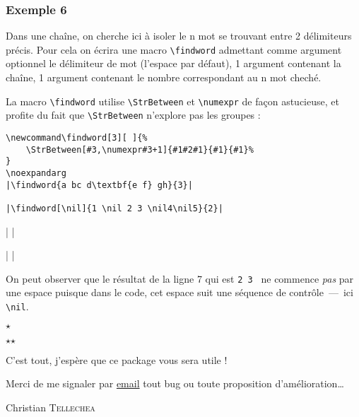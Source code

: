 \documentclass[a4paper,10pt,french]{article}
\newcommand\styleexercice{\footnotesize}
\newcommand\verbinline{\lstinline[basicstyle=\normalsize\ttfamily]}
\begin{document}
\subsubsection{Exemple 6}
Dans une chaîne, on cherche ici à isoler le n\ieme{} mot se trouvant entre 2 délimiteurs précis. Pour cela on écrira une macro \verb|\findword| admettant comme argument optionnel le délimiteur de mot (l'espace par défaut), 1 argument contenant la chaîne, 1 argument contenant le nombre correspondant au n\ieme{} mot cheché.\medskip

La macro \verb|\findword| utilise \verbinline|\StrBetween| et \verb|\numexpr| de façon astucieuse, et profite du fait que \verbinline-\StrBetween- n'explore pas les groupes :\par\nobreak\medskip
\begin{minipage}[c]{0.65\linewidth}
\begin{lstlisting}
\newcommand\findword[3][ ]{%
	\StrBetween[#3,\numexpr#3+1]{#1#2#1}{#1}{#1}%
}
\noexpandarg
|\findword{a bc d\textbf{e f} gh}{3}|

|\findword[\nil]{1 \nil 2 3 \nil4\nil5}{2}|
\end{lstlisting}%
\end{minipage}\hfill
\begin{minipage}[c]{0.35\linewidth}
	\styleexercice
	\newcommand\findword[3][ ]{%
		\StrBetween[#3,\numexpr#3+1]{#1#2#1}{#1}{#1}%
	}
	\noexpandarg
	|\findword{a bc d\textbf{e f} gh}{3}|

	|\findword[\nil]{1 \nil 2 3 \nil4\nil5}{2}|
\end{minipage}%

On peut observer que le résultat de la ligne 7 qui est \og\verb*|2 3 |\fg{} ne commence \emph{pas} par une espace puisque dans le code, cet espace suit une séquence de contrôle~---~ici \verb|\nil|.
\bigskip\bigskip
\begin{center}
$\star$\par
$\star$\quad$\star$
\end{center}
\bigskip\bigskip

C'est tout, j'espère que ce package vous sera utile !\par\nobreak
Merci de me signaler par \href{mailto:unbonpetit@netc.fr}{email} tout bug ou toute proposition d'amélioration\ldots\par\nobreak\bigskip
Christian \textsc{Tellechea}
\end{document}
